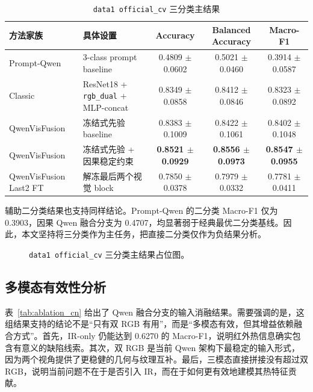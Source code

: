 \begin{table}[!t]
\caption{\texttt{data1 official\_cv} 三分类主结果}
\label{tab:data1_main_cn}
\centering
\begin{tabular}{|l|l|c|c|c|}
\hline
方法家族 & 具体设置 & Accuracy & Balanced Accuracy & Macro-F1 \\
\hline
Prompt-Qwen & 3-class prompt baseline & 0.4809 $\pm$ 0.0602 & 0.5021 $\pm$ 0.0460 & 0.3914 $\pm$ 0.0587 \\
\hline
Classic & ResNet18 + \texttt{rgb\_dual} + MLP-concat & 0.8349 $\pm$ 0.0858 & 0.8412 $\pm$ 0.0846 & 0.8323 $\pm$ 0.0892 \\
\hline
QwenVisFusion & 冻结式先验 baseline & 0.8383 $\pm$ 0.1009 & 0.8422 $\pm$ 0.1061 & 0.8402 $\pm$ 0.1048 \\
\hline
QwenVisFusion & 冻结式先验 + 因果稳定约束 & \textbf{0.8521 $\pm$ 0.0929} & \textbf{0.8556 $\pm$ 0.0973} & \textbf{0.8547 $\pm$ 0.0955} \\
\hline
QwenVisFusion Last2 FT & 解冻最后两个视觉 block & 0.7850 $\pm$ 0.0378 & 0.7979 $\pm$ 0.0332 & 0.7781 $\pm$ 0.0411 \\
\hline
\end{tabular}
\end{table}

辅助二分类结果也支持同样结论。Prompt-Qwen 的二分类 Macro-F1 仅为 0.3903，因果 Qwen 融合分支为 0.4707，均显著弱于经典最优二分类基线。因此，本文坚持将三分类作为主任务，把直接二分类仅作为负结果分析。

\begin{figure}[!t]
\centering
\fbox{\rule{0pt}{1.4in}\rule{0.95\columnwidth}{0pt}}
\caption{\texttt{data1 official\_cv} 三分类主结果占位图。}
\label{fig:data1_main_cn}
\end{figure}

\subsection{多模态有效性分析}
表~\ref{tab:ablation_cn} 给出了 Qwen 融合分支的输入消融结果。需要强调的是，这组结果支持的结论不是“只有双 RGB 有用”，而是“多模态有效，但其增益依赖融合方式”。首先，IR-only 仍能达到 0.6270 的 Macro-F1，说明红外热信息确实包含有意义的缺陷线索。其次，双 RGB 是当前 Qwen 架构下最稳定的输入形式，因为两个视角提供了更稳健的几何与纹理互补。最后，三模态直接拼接没有超过双 RGB，说明当前问题不在于是否引入 IR，而在于如何更有效地建模其热特征贡献。

